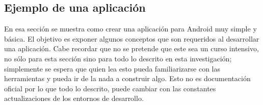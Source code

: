 %
%
%
%
%
%
%

\subsection*{Ejemplo de una aplicación}
\label{\detokenize{dev_docs:una-primera-aplicacion}}
En esa sección se muestra como crear una aplicación para Android muy simple
y básica. El objetivo es exponer algunos conceptos que son requeridos al
desarrollar una aplicación. Cabe recordar que no se pretende que este sea un
curso intensivo, no sólo para esta sección sino para todo lo descrito en esta
investigación;
simplemente se espera que quien lea esto pueda familiarizarse con las herramientas y pueda ir
de la nada a construir algo. Esto no es documentación oficial por lo que todo
lo descrito, puede cambiar con las constantes actualizaciones de los entornos
de desarrollo.

